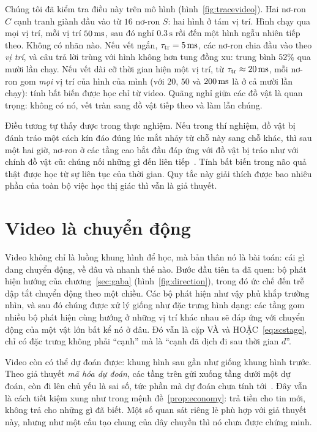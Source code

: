 Chúng tôi đã kiểm tra điều này trên mô hình (hình~\ref{fig:tracevideo}). Hai nơ-ron $C$ cạnh tranh giành đầu vào từ $16$ nơ-ron $S$: hai hình ở tám vị trí. Hình chạy qua mọi vị trí, mỗi vị trí $50\,\text{ms}$, sau đó nghỉ $0.3\,\text{s}$ rồi đến một hình ngẫu nhiên tiếp theo. Không có nhãn nào. Nếu vết ngắn, $\tau_{\text{tr}}=5\,\text{ms}$, các nơ-ron chia đầu vào theo \emph{vị trí}, và câu trả lời trùng với hình không hơn tung đồng xu: trung bình $52\%$ qua mười lần chạy. Nếu vết dài cỡ thời gian hiện một vị trí, từ $\tau_{\text{tr}}\approx20\,\text{ms}$, mỗi nơ-ron gom \emph{mọi} vị trí của hình của mình (với $20$, $50$ và $200\,\text{ms}$ là ở cả mười lần chạy): tính bất biến được học chỉ từ video. Quãng nghỉ giữa các đồ vật là quan trọng: không có nó, vết tràn sang đồ vật tiếp theo và làm lẫn chúng.

Điều tương tự thấy được trong thực nghiệm. Nếu trong thí nghiệm, đồ vật bị đánh tráo một cách kín đáo đúng lúc mắt nhảy từ chỗ này sang chỗ khác, thì sau một hai giờ, nơ-ron ở các tầng cao bắt đầu đáp ứng với đồ vật bị tráo như với chính đồ vật cũ: chúng nối những gì đến liên tiếp~\cite{LiDiCarlo2008}. Tính bất biến trong não quả thật được học từ sự liên tục của thời gian. Quy tắc này giải thích được bao nhiêu phần của toàn bộ việc học thị giác thì vẫn là giả thuyết.

\section{Video là chuyển động}

Video không chỉ là luồng khung hình để học, mà bản thân nó là bài toán: cái gì đang chuyển động, về đâu và nhanh thế nào. Bước đầu tiên ta đã quen: bộ phát hiện hướng của chương~\ref{sec:gaba} (hình~\ref{fig:direction}), trong đó ức chế đến trễ dập tắt chuyển động theo một chiều. Các bộ phát hiện như vậy phủ khắp trường nhìn, và sau đó chúng được xử lý giống như đặc trưng hình dạng: các tầng gom nhiều bộ phát hiện cùng hướng ở những vị trí khác nhau sẽ đáp ứng với chuyển động của một vật lớn bất kể nó ở đâu. Đó vẫn là cặp VÀ và HOẶC~\eqref{eq:scstage}, chỉ có đặc trưng không phải ``cạnh'' mà là ``cạnh đã dịch đi sau thời gian $d$''.

Video còn có thể dự đoán được: khung hình sau gần như giống khung hình trước. Theo giả thuyết \emph{mã hóa dự đoán}, các tầng trên gửi xuống tầng dưới một dự đoán, còn đi lên chủ yếu là sai số, tức phần mà dự đoán chưa tính tới~\cite{RaoBallard1999}. Đây vẫn là cách tiết kiệm xung như trong mệnh đề~\ref{prop:economy}: trả tiền cho tin mới, không trả cho những gì đã biết. Một số quan sát riêng lẻ phù hợp với giả thuyết này, nhưng như một cấu tạo chung của dây chuyền thì nó chưa được chứng minh.

